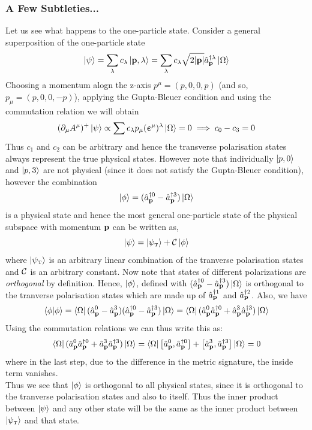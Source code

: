 \subsubsection{A Few Subtleties...}
Let us see what happens to the one-particle state. Consider a general superposition of the one-particle state 
$$\ket{\psi} = \sum\limits_{\lambda} c_\lambda \ket{\vb{p}, \lambda} = \sum\limits_\lambda c_\lambda \sqrt{2|\vb{p}|} \hat{a}_{\vb{p}}^{\dagger\lambda}\ket{\Omega}$$
Choosing a momentum alogn the z-axis $p^\mu = (p,0,0,p)$ (and so, $p_\mu = (p,0,0,-p)$), applying the Gupta-Bleuer condition and using the commutation relation we will obtain
$$(\partial_\mu A^\mu)^+ \ket{\psi} \propto \sum c_\lambda p_\mu (\upepsilon^\mu)^\lambda \ket{\Omega} =0 \implies c_0 - c_3 =0$$
Thus $c_1$ and $c_2$ can be arbitrary and hence the transverse polarisation states always represent the true physical states. However note that individually $\ket{p,0}$ and $\ket{p,3}$ are not physical (since it does not satisfy the Gupta-Bleuer condition), however the combination $$\ket{\phi} = (\hat{a}_{\vb{p}}^{\dagger0} - \hat{a}_{\vb{p}}^{\dagger 3})\ket{\Omega}$$
is a physical state and hence the most general one-particle state of the physical subspace with momentum $\vb{p}$ can be written as,
$$\ket{\psi} = \ket{\psi_{\text{\tiny T}}} + \mathcal C \ket{\phi}$$
where $\ket{\psi_{\text{\tiny T}}} $ is an arbitrary linear combination of the tranverse polarisation states and $\mathcal C$ is an arbitrary constant. Now note that states of different polarizations are \textit{orthogonal} by definition. Hence, $\ket{\phi}$, defined with $(\hat{a}_{\vb{p}}^{\dagger0} - \hat{a}_{\vb{p}}^{\dagger 3})\ket{\Omega}$ is orthogonal to the tranverse polarisation states which are made up of $\hat{a}_{\vb{p}}^{\dagger1} $ and $\hat{a}_{\vb{p}}^{\dagger2}$. Also, we have 
$$\braket{\phi|\phi} =\bra{\Omega} (\hat{a}_{\vb{p}}^{0} - \hat{a}_{\vb{p}}^{3})  (\hat{a}_{\vb{p}}^{\dagger0} - \hat{a}_{\vb{p}}^{\dagger 3})\ket{\Omega} = \bra{\Omega} (\hat{a}_{\vb{p}}^{0} \hat{a}_{\vb{p}}^{\dagger0} +\hat{a}_{\vb{p}}^{3} \hat{a}_{\vb{p}}^{\dagger3})\ket{\Omega}$$
Using the commutation relations we can thus write this as:
$$\bra{\Omega} (\hat{a}_{\vb{p}}^{0} \hat{a}_{\vb{p}}^{\dagger0} +\hat{a}_{\vb{p}}^{3} \hat{a}_{\vb{p}}^{\dagger3})\ket{\Omega} =\bra{\Omega} \left[ \hat{a}_{\vb{p}}^{0},  \hat{a}_{\vb{p}}^{\dagger0} \right] + \left[ \hat{a}_{\vb{p}}^{3}, \hat{a}_{\vb{p}}^{\dagger3} \right]\ket{\Omega} = 0$$
where in the last step, due to the difference in the metric signature, the inside term vanishes.\\[0.2cm] Thus we see that $\ket{\phi}$ is orthogonal to all physical states, since it is orthogonal to the tranverse polarisation states and also to itself. Thus the inner product between $\ket{\psi}$ and any other state will be the same as the inner product between $\ket{\psi_{\text{\tiny T}}}$ and that state. \\[0.2cm]
